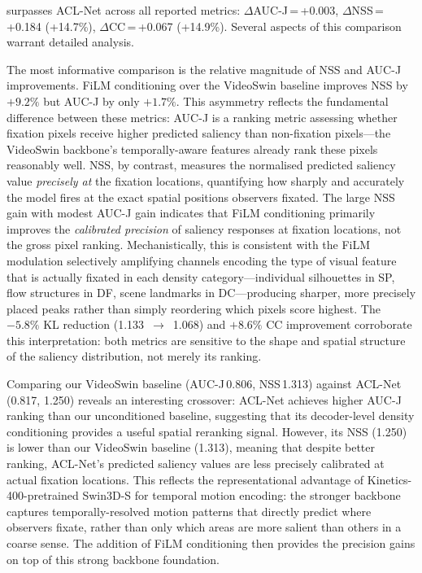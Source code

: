 \documentclass[twocolumn]{article}
\begin{document}
\ourmodel{} surpasses ACL-Net across all reported metrics:
$\Delta$AUC-J\,=\,+0.003, $\Delta$NSS\,=\,+0.184 (+14.7\%),
$\Delta$CC\,=\,+0.067 (+14.9\%).  Several aspects of this comparison
warrant detailed analysis.

The most informative comparison is the relative magnitude of NSS and AUC-J
improvements.  FiLM conditioning over the VideoSwin baseline improves NSS
by $+9.2\%$ but AUC-J by only $+1.7\%$.  This asymmetry reflects the
fundamental difference between these metrics: AUC-J is a ranking metric
assessing whether fixation pixels receive higher predicted saliency than
non-fixation pixels---the VideoSwin backbone's temporally-aware features
already rank these pixels reasonably well.  NSS, by contrast, measures
the normalised predicted saliency value \emph{precisely at} the fixation
locations, quantifying how sharply and accurately the model fires at the
exact spatial positions observers fixated.  The large NSS gain with modest
AUC-J gain indicates that FiLM conditioning primarily improves the
\emph{calibrated precision} of saliency responses at fixation locations,
not the gross pixel ranking.  Mechanistically, this is consistent with the
FiLM modulation selectively amplifying channels encoding the type of visual
feature that is actually fixated in each density category---individual
silhouettes in SP, flow structures in DF, scene landmarks in DC---producing
sharper, more precisely placed peaks rather than simply reordering which
pixels score highest.  The $-5.8\%$ KL reduction (1.133~$\to$~1.068) and
$+8.6\%$ CC improvement corroborate this interpretation: both metrics are
sensitive to the shape and spatial structure of the saliency distribution,
not merely its ranking.

Comparing our VideoSwin baseline (AUC-J\,0.806, NSS\,1.313) against
ACL-Net (0.817, 1.250) reveals an interesting crossover: ACL-Net achieves
higher AUC-J ranking than our unconditioned baseline, suggesting that its
decoder-level density conditioning provides a useful spatial reranking
signal.  However, its NSS (1.250) is lower than our VideoSwin baseline
(1.313), meaning that despite better ranking, ACL-Net's predicted saliency
values are less precisely calibrated at actual fixation locations.
This reflects the representational advantage of Kinetics-400-pretrained
Swin3D-S for temporal motion encoding: the stronger backbone captures
temporally-resolved motion patterns that directly predict where observers
fixate, rather than only which areas are more salient than others in a
coarse sense.  The addition of FiLM conditioning then provides the precision
gains on top of this strong backbone foundation.
\end{document}
